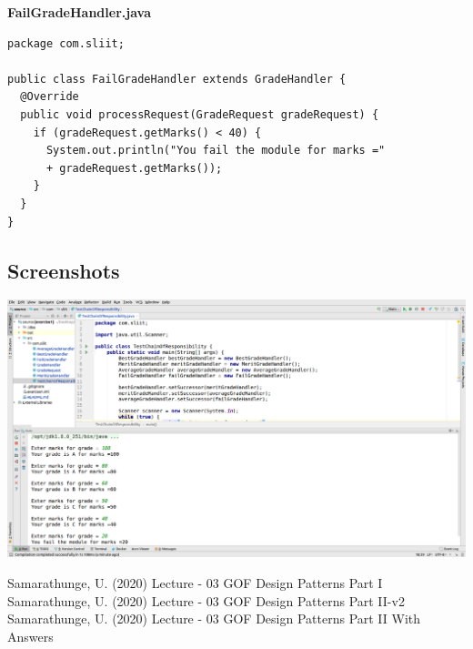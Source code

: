 \documentclass[12pt]{scrartcl} %
\begin{document}
\textbf{FailGradeHandler.java}
\lstset{language=Java}
\begin{lstlisting}[frame=single]
package com.sliit;

public class FailGradeHandler extends GradeHandler {
  @Override
  public void processRequest(GradeRequest gradeRequest) {
    if (gradeRequest.getMarks() < 40) {
      System.out.println("You fail the module for marks =" 
      + gradeRequest.getMarks());
    }
  }
}

\end{lstlisting}

\subsection*{Screenshots}

\begin{center}
	\includegraphics[width=1.0\columnwidth]{./figures/01.png}
	\label{Solution}%
\end{center}


\pagebreak
\newpage
\begin{thebibliography}{00}
	\raggedright
	 Samarathunge, U. (2020) Lecture - 03 GOF Design Patterns Part I
     Samarathunge, U. (2020) Lecture - 03 GOF Design Patterns Part II-v2
     Samarathunge, U. (2020) Lecture - 03 GOF Design Patterns Part II With Answers
\end{thebibliography}
\end{document}
